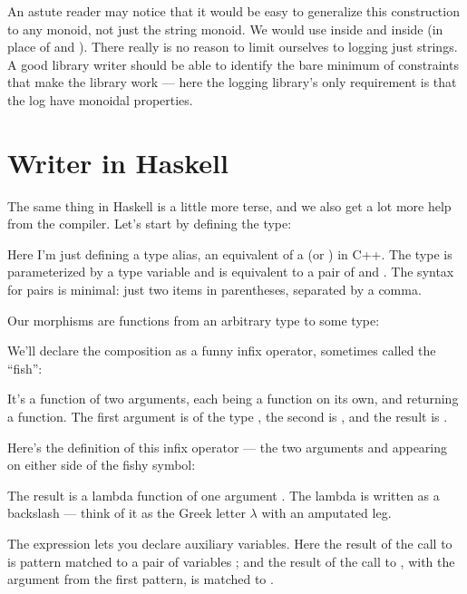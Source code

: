 An astute reader may notice that it would be easy to generalize this
construction to any monoid, not just the string monoid. We would use
 inside  and  inside
 (in place of \code{+} and ). There really
is no reason to limit ourselves to logging just strings. A good library
writer should be able to identify the bare minimum of constraints that
make the library work --- here the logging library's only requirement is
that the log have monoidal properties.

\section{Writer in Haskell}

The same thing in Haskell is a little more terse, and we also get a lot
more help from the compiler. Let's start by defining the 
type:

Here I'm just defining a type alias, an equivalent of a 
(or ) in C++. The type  is parameterized by
a type variable  and is equivalent to a pair of  and
. The syntax for pairs is minimal: just two items in
parentheses, separated by a comma.

Our morphisms are functions from an arbitrary type to some
 type:

We'll declare the composition as a funny infix operator, sometimes
called the ``fish'':

It's a function of two arguments, each being a function on its own, and
returning a function. The first argument is of the type
, the second is
, and the result is
.

Here's the definition of this infix operator --- the two arguments
 and  appearing on either side of the fishy
symbol:

The result is a lambda function of one argument . The lambda
is written as a backslash --- think of it as the Greek letter $\lambda$ with an
amputated leg.

The  expression lets you declare auxiliary variables. Here
the result of the call to  is pattern matched to a pair of
variables ; and the result of the call to ,
with the argument  from the first pattern, is matched to
.

